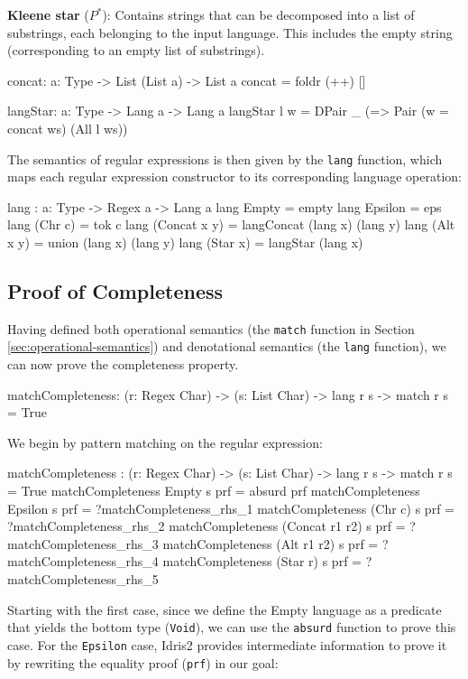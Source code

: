 \documentclass[]{rptuseminar}
\begin{document}
\textbf{Kleene star} ($P^*$): Contains strings that can be decomposed into a list of substrings, each belonging to the input language. This includes the empty string (corresponding to an empty list of substrings).
\begin{idris}
concat: {a: Type} -> List (List a) -> List a
concat = foldr (++) []

langStar: {a: Type} -> Lang a -> Lang a
langStar l w = DPair _ (\ws => Pair (w = concat ws) (All l ws))
\end{idris}

The semantics of regular expressions is then given by the \texttt{lang} function, which maps each regular expression constructor to its corresponding language operation:
\begin{idris}
lang : {a: Type} -> Regex a -> Lang a
lang Empty = empty
lang Epsilon = eps
lang (Chr c) = tok c
lang (Concat x y) = langConcat (lang x) (lang y)
lang (Alt x y) = union (lang x) (lang y)
lang (Star x) = langStar (lang x)
\end{idris}

\subsection{Proof of Completeness}
\label{sec:proof-of-completeness}

Having defined both operational semantics (the \texttt{match} function in Section \ref{sec:operational-semantics}) and denotational semantics (the \texttt{lang} function), we can now prove the completeness property.

\begin{idris}
matchCompleteness: (r: Regex Char) -> (s: List Char) -> lang r s -> match r s = True
\end{idris}

We begin by pattern matching on the regular expression:

\begin{idris}
matchCompleteness : (r: Regex Char) -> (s: List Char) ->
    lang r s -> match r s = True
matchCompleteness Empty s prf = absurd prf
matchCompleteness Epsilon s prf = ?matchCompleteness_rhs_1
matchCompleteness (Chr c) s prf = ?matchCompleteness_rhs_2
matchCompleteness (Concat r1 r2) s prf = ?matchCompleteness_rhs_3
matchCompleteness (Alt r1 r2) s prf = ?matchCompleteness_rhs_4
matchCompleteness (Star r) s prf = ?matchCompleteness_rhs_5
\end{idris}

Starting with the first case, since we define the Empty language as a predicate that yields the bottom type (\texttt{Void}), we can use the \texttt{absurd} function to prove this case. For the \texttt{Epsilon} case, Idris2 provides intermediate information to prove it by rewriting the equality proof (\texttt{prf}) in our goal:
\end{document}
